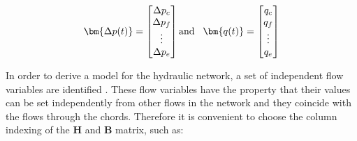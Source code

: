 
\begin{equation}
\bm{\Delta p(t)} =
\begin{bmatrix}
         \Delta p_c \\
	\Delta p_f \\ 
	\vdots \\
	\Delta p_e \\
\end{bmatrix}
\text{and}\hspace{0.3cm}
\bm{q(t)} =
\begin{bmatrix}
         q_c \\
	q_f \\ 
	\vdots \\
	q_e \\
\end{bmatrix}
\end{equation}


In order to derive a model for the hydraulic network, a set of independent flow variables are identified \cite{TowerModel}. These flow variables have the property that their values can be set independently from other flows in the network and they coincide with the flows through the chords. 
Therefore it is convenient to choose the column indexing of the 
$\pmb{H}$ and $\pmb{B}$ matrix, such as:



